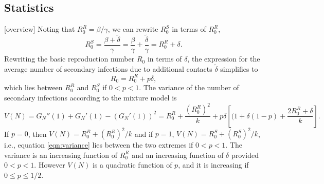 \documentclass{imammb}
\numberwithin{equation}{section}
\begin{document}
\subsection{Statistics} %
[overview]
Noting that $R_0^R = \beta/\gamma$,  we can rewrite $R_0^S$ in terms of $R_0^R$,
\begin{equation}
R_0^S = \frac{\beta + \tilde{\delta}}{\gamma} = \frac{\beta}{\gamma} + \frac{ \tilde{\delta}}{\gamma} = R_0^R + \delta. 
\end{equation}
Rewriting the basic reproduction number $R_0$ in terms of $\delta$, the expression for the average number of secondary infections due to additional contacts $\tilde{\delta}$ simplifies to 
\begin{equation}\label{eqn:R0delta}
R_0 = R_0^R + p \delta,
\end{equation}
which lies between $R_0^R$ and $R_0^S$ if $0<p<1$. 
The variance of the number of secondary infections according to the mixture model is %
\begin{equation}\label{eqn:variance}
V(N) = G_N''(1) + G_N'(1) -  (G_N'(1))^2= R_0^R + \frac{(R_0^R)^2}{k} + p \delta \left [ (1+ \delta(1-p) + \frac{2 R_0^R + \delta}{k} \right ]. 
\end{equation}
If $p=0$, then $V(N) = R_0^R + (R_0^R)^2/k$ and if $p=1$, $V(N) = R_0^S + (R_0^S)^2/k$, i.e., equation \eqref{eqn:variance} lies between the two extremes if $0<p<1$. The variance is an increasing function of $R_0^R$ and an increasing function of $\delta$ provided $0<p<1$. However $V(N)$ is a quadratic function of $p$, and it is increasing if $0\leq p \leq 1/2$.

\end{document}

